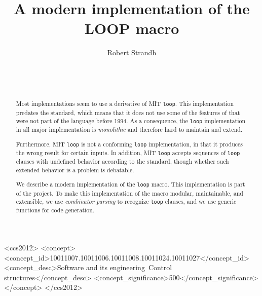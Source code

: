 \documentclass{sig-alternate-05-2015}
\def\inputtex#1{}
\def\mitloop{MIT \texttt{loop}}
\begin{document}
\title{A modern implementation of the LOOP macro}
\author{\alignauthor
Robert Strandh\\
\\
\\
\\
}

\maketitle

\begin{abstract}
Most \commonlisp{} implementations seem to use a derivative of
\mitloop{}.  This implementation predates the \commonlisp{} standard,
which means that it does not use some of the features of \commonlisp{}
that were not part of the language before 1994.  As a consequence, the
\texttt{loop} implementation in all major \commonlisp{} implementation
is \emph{monolithic} and therefore hard to maintain and extend.

Furthermore, \mitloop{} is not a conforming \texttt{loop}
implementation, in that it produces the wrong result for certain
inputs.  In addition, \mitloop{} accepts sequences of \texttt{loop}
clauses with undefined behavior according to the standard, though
whether such extended behavior is a problem is debatable.

We describe a modern implementation of the \commonlisp{} \texttt{loop}
macro.  This implementation is part of the \sicl{} project.  To make
this implementation of the macro modular, maintainable, and
extensible, we use \emph{combinator parsing} to recognize
\texttt{loop} clauses, and we use \clos{} generic functions for code
generation.
\end{abstract}

\begin{CCSXML}
  <ccs2012>
  <concept>
  <concept_id>10011007.10011006.10011008.10011024.10011027</concept_id>
  <concept_desc>Software and its engineering~Control structures</concept_desc>
  <concept_significance>500</concept_significance>
  </concept>
  </ccs2012>
\end{CCSXML}


\printccsdesc


\inputtex{sec-introduction.tex}
\inputtex{sec-previous.tex}
\inputtex{sec-our-method.tex}
\inputtex{sec-benefits.tex}
\inputtex{sec-conclusions.tex}
\inputtex{sec-acknowledgments.tex}



\end{document}
